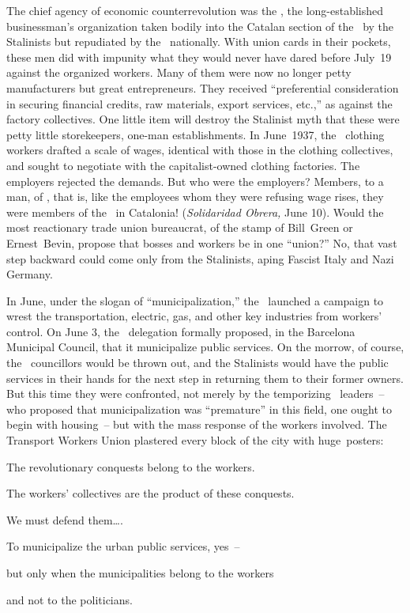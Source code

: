 The chief agency of economic counterrevolution was the \GEPCI, the long-established businessman’s organization taken bodily into the Catalan section of the \UGT\ by the Stalinists but repudiated by the \UGT\ nationally. With union cards in their pockets, these men did with impunity what they would never have dared before July~19 against the organized workers. Many of them were now no longer petty manufacturers but great entrepreneurs. They received ``pref\-er\-en\-tial consideration in securing financial credits, raw materials, export services, etc.,\kn\kn'' as against the factory collectives. One little item will destroy the Stalinist myth that these were petty little storekeepers, one-man establishments. In June~1937\kn, the \UGT\ clothing workers drafted a scale of wages, identical with those in the clothing collectives, and sought to negotiate with the capitalist-owned clothing factories. The employers rejected the demands. But who were the employers? Members, to a man, of \GEPCI\indexGEPCI, that is, like the employees whom they were refusing wage rises, they were members of the \UGT\ in Catalonia! (\emph{Solidaridad Obrera,} June 10). Would the most reactionary trade union bureaucrat, of the stamp of Bill~Green or Ernest~Bevin, propose that bosses and workers be in one ``union?\kp'' No, that vast step backward could come only from the Stalinists, aping Fascist Italy and Nazi Germany.

In June, under the slogan of ``municipalization,\kn\kn'' the \PSUC\ launch\-ed a campaign to wrest the transportation, electric, gas, and other key industries from workers’ control. On June 3, the \PSUC\ delegation formally proposed, in the Barcelona Municipal Council, that it municipalize public services. On the morrow, of course, the \CNT\ councillors would be thrown out, and the Stalinists would have the public services in their hands for the next step in returning them to their former owners. But this time they were confronted, not merely by the temporizing \CNT\ leaders~-- who proposed that municipalization was ``premature'' in this field, one ought to begin with housing~-- but with the mass response of the workers involved. The Transport Workers Union plastered every block of the city with huge~posters:

\medskip

\begin{oframed}
  \centering
  \setlength{\parskip}{0.5\baselineskip}
  
  \medskip
  The revolutionary conquests belong to the workers.
  
  The workers’ collectives are the product of these conquests.
  
  We must defend them\dots.
  
  To municipalize the urban public services, yes~--
  
  but only when the municipalities belong to the workers
  
  and not to the politicians.
  \medskip
\end{oframed}


